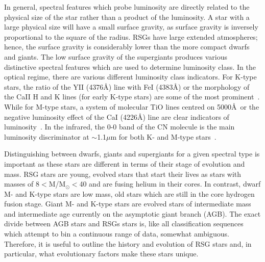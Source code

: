 In general, spectral features which probe luminosity are directly related to the physical size of the star rather than a product of the luminosity.
A star with a large physical size will have a small surface gravity, as surface gravity is inversely proportional to the square of the radius.
RSGs have large extended atmospheres; hence, the surface gravity is considerably lower than the more compact dwarfs and giants.
The low surface gravity of the supergiants produces various distinctive spectral features which are used to determine luminosity class.
In the optical regime, there are various different luminosity class indicators.
For K-type stars, the ratio of the YII (4376\AA) line with FeI (4383\AA) or the morphology of the CaII H and K lines (for early K-type stars) are some of the most prominent~\citep{b:GrayCorbally}.
While for M-type stars, a system of molecular TiO lines centred on 5000\AA ~or the negative luminosity effect of the CaI (4226\AA) line are clear indicators of luminosity~\citep{b:GrayCorbally}.
In the infrared, the 0-0 band of the CN molecule is the main luminosity discriminator at $\sim$1.1$\mu$m for both K- and M-type stars~\citep{b:GrayCorbally}.




Distinguishing between dwarfs, giants and supergiants for a given spectral type is important as these stars are different in terms of their stage of evolution and mass.
RSG stars are young, evolved stars that start their lives as stars with masses of 8$<$M/M$_{\odot}<$40 and are fusing helium in their cores.
In contrast, dwarf M- and K-type stars are low mass, old stars which are still in the core hydrogen fusion stage.
Giant M- and K-type stars are evolved stars of intermediate mass and intermediate age currently on the asymptotic giant branch (AGB).
The exact divide between AGB stars and RSGs stars is, like all classification sequences which attempt to bin a continuous range of data, somewhat ambiguous.
Therefore, it is useful to outline the history and evolution of RSG stars and, in particular, what evolutionary factors make these stars unique.

